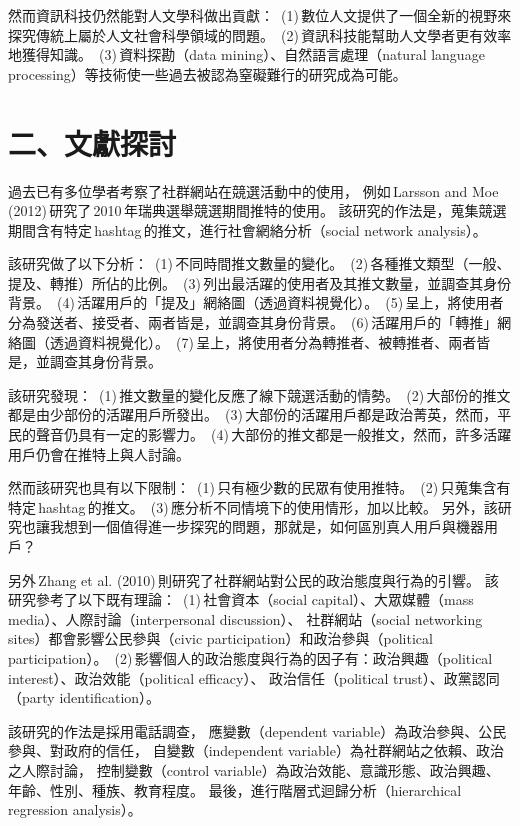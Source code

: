 \documentclass[letterpaper, 10pt, conference]{ieeeconf}   %
\begin{document}
\begin{CJK*}{UTF8}{bsmi}
然而資訊科技仍然能對人文學科做出貢獻：
\,(1)\,數位人文提供了一個全新的視野來探究傳統上屬於人文社會科學領域的問題。
\,(2)\,資訊科技能幫助人文學者更有效率地獲得知識。
\,(3)\,資料探勘（data mining）、自然語言處理（natural language processing）等技術使一些過去被認為窒礙難行的研究成為可能。

\section*{二、文獻探討}

過去已有多位學者考察了社群網站在競選活動中的使用，
例如\,Larsson and Moe (2012)\,研究了\,2010\,年瑞典選舉競選期間推特的使用。\cite{c1}
該研究的作法是，蒐集競選期間含有特定\,hashtag\,的推文，進行社會網絡分析（social network analysis）。

該研究做了以下分析：
\,(1)\,不同時間推文數量的變化。
\,(2)\,各種推文類型（一般、提及、轉推）所佔的比例。
\,(3)\,列出最活躍的使用者及其推文數量，並調查其身份背景。
\,(4)\,活躍用戶的「提及」網絡圖（透過資料視覺化）。
\,(5)\,呈上，將使用者分為發送者、接受者、兩者皆是，並調查其身份背景。
\,(6)\,活躍用戶的「轉推」網絡圖（透過資料視覺化）。
\,(7)\,呈上，將使用者分為轉推者、被轉推者、兩者皆是，並調查其身份背景。

該研究發現：
\,(1)\,推文數量的變化反應了線下競選活動的情勢。
\,(2)\,大部份的推文都是由少部份的活躍用戶所發出。
\,(3)\,大部份的活躍用戶都是政治菁英，然而，平民的聲音仍具有一定的影響力。
\,(4)\,大部份的推文都是一般推文，然而，許多活躍用戶仍會在推特上與人討論。

然而該研究也具有以下限制：
\,(1)\,只有極少數的民眾有使用推特。
\,(2)\,只蒐集含有特定\,hashtag\,的推文。
\,(3)\,應分析不同情境下的使用情形，加以比較。
另外，該研究也讓我想到一個值得進一步探究的問題，那就是，如何區別真人用戶與機器用戶？

另外\,Zhang et al. (2010)\,則研究了社群網站對公民的政治態度與行為的引響。\cite{c2}
該研究參考了以下既有理論：
\,(1)\,社會資本（social capital）、大眾媒體（mass media）、人際討論（interpersonal discussion）、
社群網站（social networking sites）都會影響公民參與（civic participation）和政治參與（political participation）。
\,(2)\,影響個人的政治態度與行為的因子有：政治興趣（political interest）、政治效能（political efficacy）、
政治信任（political trust）、政黨認同（party identification）。

該研究的作法是採用電話調查，
應變數（dependent variable）為政治參與、公民參與、對政府的信任，
自變數（independent variable）為社群網站之依賴、政治之人際討論，
控制變數（control variable）為政治效能、意識形態、政治興趣、年齡、性別、種族、教育程度。
最後，進行階層式迴歸分析（hierarchical regression analysis）。


\end{CJK*}
\end{document}
